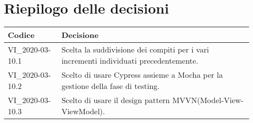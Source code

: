 \section{Riepilogo delle decisioni}
\setcounter{table}{-1}
{

\centering
\renewcommand{\arraystretch}{1.5}
\begin{longtable}{>{\centering}p{} >{}p{}}
\rowcolor{azzurro1}
\textbf{Codice} &
\centerline{\textbf{Decisione}}\\
\endhead

VI{\_}2020-03-10.1 & Scelta la suddivisione dei compiti per i vari incrementi individuati precedentemente.\\
VI{\_}2020-03-10.2 & Scelto di usare Cypress assieme a Mocha per la gestione della fase di testing.\\
VI{\_}2020-03-10.3 & Scelto di usare il design pattern MVVN(Model-View-ViewModel).\\
\end{longtable}
}